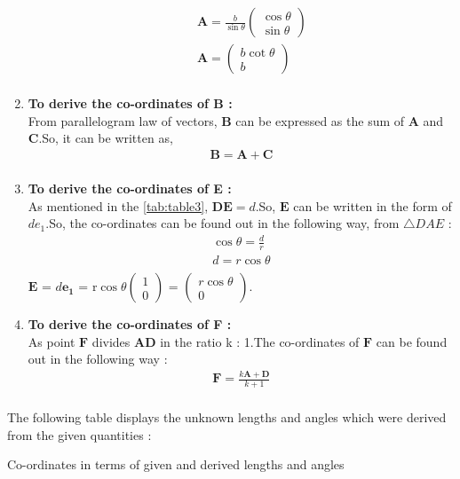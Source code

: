 \documentclass{article}
\newcommand{\myvec}[1]{\ensuremath{\begin{pmatrix}#1\end{pmatrix}}}
\let\vec\mathbf
\begin{document}
\begin{enumerate}
\begin{enumerate}
		\begin{align}
			\vec{A} = \frac{b}{\sin{\theta}}\myvec{\cos{\theta}\\\sin{\theta}}\\
			\vec{A} = \myvec{b\cot{\theta}\\b}\\
		\end{align}
		\end{enumerate}
	\item \textbf{To derive the co-ordinates of B :}\\
		From parallelogram law of vectors, $\vec{B}$ can be expressed as the sum of $\vec{A}$ and $\vec{C}$.So, it can be written as,\\
		\begin{align}
			\vec{B} = \vec{A} + \vec{C}\\
		\end{align}
	\item \textbf{To derive the co-ordinates of E :}\\
		As mentioned in the \ref{tab:table3}, $\vec{DE} = d$.So, $\vec{E}$ can be written in the form of $de_1$.So, the co-ordinates can be found out in the following way, from $\triangle{DAE}$ :\\
		\begin{align}
			\cos{\theta} = \frac{d}{r}\\
			d = r\cos{\theta}\\
		\end{align}
		 $\vec{E}$ = $d\vec{e_1}$ = r$\cos{\theta}\myvec{1\\0}$ = $\myvec{r\cos{\theta}\\0}$.\\
	 \item \textbf{To derive the co-ordinates of F :}\\
		 As point $\vec{F}$ divides $\vec{AD}$ in the ratio k : 1.The co-ordinates of $\vec{F}$ can be found out in the following way : \\
		 \begin{align}
			 \vec{F} = \frac{k\vec{A} + \vec{D}}{k + 1}\\
		 \end{align}
\end{enumerate}
The following table displays the unknown lengths and angles which were derived from the given quantities :\\
\begin{table}[h]
	\centering
	
	\caption{Co-ordinates in terms of given and derived lengths and angles}
	\label{tab:table4}
\end{table}\\
\end{document}
